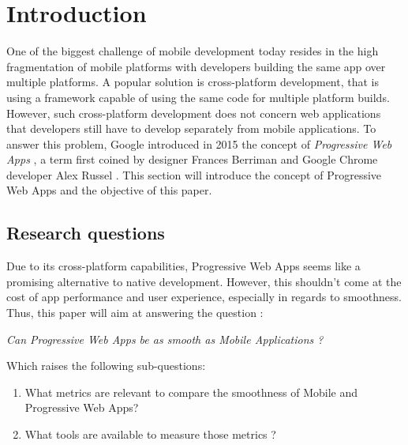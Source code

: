 

\chapter{Introduction}

One of the biggest challenge of mobile development today resides in the high fragmentation of mobile platforms \cite{MobileDevChallenges} with developers building the same app over multiple platforms. A popular solution is cross-platform development, that is using a framework capable of using the same code for multiple platform builds. However, such cross-platform development does not concern web applications that developers still have to develop separately from mobile applications. To answer this problem, Google introduced in 2015 the concept of \textit{Progressive Web Apps} \cite{PWA_intro}, a term first coined by designer Frances Berriman and Google Chrome  developer Alex Russel \cite{PWA_blog} \cite{PWApossibleUnifer}.
This section will introduce the concept of Progressive Web Apps and the objective of this paper.


\section{Research questions}

Due to its cross-platform capabilities, Progressive Web Apps seems like a promising alternative to native development. However, this shouldn't come at the cost of app performance and user experience, especially in regards to smoothness.
Thus, this paper will aim at answering the question : 
\begin{center}
    \textit{Can Progressive Web Apps be as smooth as Mobile Applications ?}
\end{center}
Which raises the following sub-questions: 
\begin{enumerate}
    \item What metrics are relevant to compare the smoothness of Mobile and Progressive Web Apps?
    \item What tools are available to measure those metrics ?
\end{enumerate}

